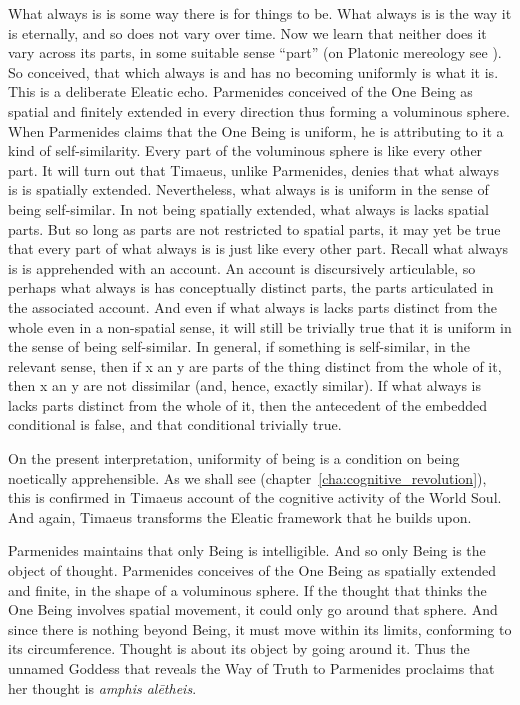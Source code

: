 What always is is some way there is for things to be. What always is is the way it is eternally, and so does not vary over time. Now we learn that neither does it vary across its parts, in some suitable sense ``part'' (on Platonic mereology see \citealt{Harte:2002tl}). So conceived, that which always is and has no becoming uniformly is what it is. This is a deliberate Eleatic echo. Parmenides conceived of the One Being as spatial and finitely extended in every direction thus forming a voluminous sphere. When Parmenides claims that the One Being is uniform, he is attributing to it a kind of self-similarity. Every part of the voluminous sphere is like every other part. It will turn out that Timaeus, unlike Parmenides, denies that what always is is spatially extended. Nevertheless, what always is is uniform in the sense of being self-similar. In not being spatially extended, what always is lacks spatial parts. But so long as parts are not restricted to spatial parts, it may yet be true that every part of what always is is just like every other part. Recall what always is is apprehended with an account. An account is discursively articulable, so perhaps what always is has conceptually distinct parts, the parts articulated in the associated account. And even if what always is lacks parts distinct from the whole even in a non-spatial sense, it will still be trivially true that it is uniform in the sense of being self-similar. In general, if something is self-similar, in the relevant sense, then if x an y are parts of the thing distinct from the whole of it, then x an y are not dissimilar (and, hence, exactly similar). If what always is lacks parts distinct from the whole of it, then the antecedent of the embedded conditional is false, and that conditional trivially true.

On the present interpretation, uniformity of being is a condition on being noetically apprehensible. As we shall see (chapter~\ref{cha:cognitive_revolution}), this is confirmed in Timaeus account of the cognitive activity of the World Soul. And again, Timaeus transforms the Eleatic framework that he builds upon. 

Parmenides maintains that only Being is intelligible. And so only Being is the object of thought. Parmenides conceives of the One Being as spatially extended and finite, in the shape of a voluminous sphere. If the thought that thinks the One Being involves spatial movement, it could only go around that sphere. And since there is nothing beyond Being, it must move within its limits, conforming to its circumference. Thought is about its object by going around it. Thus the unnamed Goddess that reveals the Way of Truth to Parmenides proclaims that her thought is \emph{amphis alētheis}.


